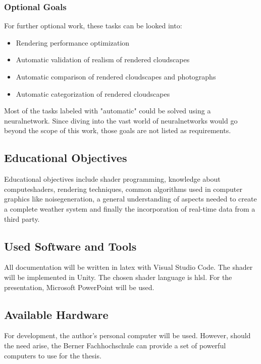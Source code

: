 \subsubsection{Optional Goals}
\label{section:goals:optional}
For further optional work, these tasks can be looked into:
\begin{itemize}
    \item Rendering performance optimization
    \item Automatic validation of realism of rendered cloudscapes
    \item Automatic comparison of rendered cloudscapes and photographs
    \item Automatic categorization of rendered cloudscapes
\end{itemize}

\noindent
Most of the tasks labeled with "automatic" could be solved using a \gls{neuralnetwork}.
Since diving into the vast world of \gls{neuralnetwork}s would go beyond the scope of this work, those goals are not listed as requirements.

\subsection{Educational Objectives}
Educational objectives include \gls{shader} programming, knowledge about \gls{computeshader}s, rendering techniques, common algorithms used in computer graphics like \gls{noisegeneration}, a general understanding of aspects needed to create a complete weather system and finally the incorporation of real-time data from a third party.

\subsection{Used Software and Tools}
All documentation will be written in \gls{latex} with Visual Studio Code.
The \gls{shader} will be implemented in Unity. The chosen \gls{shader} language is \gls{hlsl}.
For the presentation, Microsoft PowerPoint will be used.

\subsection{Available Hardware}
For development, the author's personal computer will be used. However, should the need arise, the Berner Fachhochschule can provide a set of powerful computers to use for the thesis.